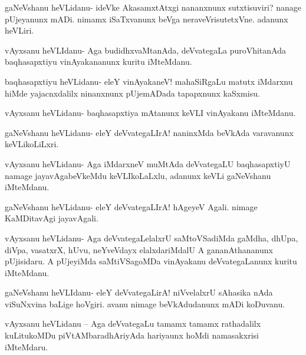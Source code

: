 \documentclass{article}
\begin{document}
\begin{mng}%
gaNeVshanu heVLidanu- ideVke AkasamxtAtxgi nananxnunx sutxtisuviri? nanage pUjeyanunx mADi. nimamx iSaTxvanunx beVga neraveVrisutetxVne. adanunx heVLiri.
\end{mng}

\begin{mng}%
vAyxsanu heVLIdanu- Aga budidhxvaMtanAda, deVvategaLa puroVhitanAda baqhasapxtiyu vinAyakananunx kuritu iMteMdanu.
\end{mng}

\begin{mng}%
baqhasapxtiyu heVLidanu- eleY vinAyakaneV! mahaSiRgaLu matutx iMdarxnu hiMde yajacnxdalilx ninanxnunx pUjemADada tapapxnunx kaSxmisu. 
\end{mng}

\begin{mng}%
vAyxsanu heVLidanu- baqhasapxtiya mAtanunx keVLI vinAyakanu iMteMdanu.
\end{mng}

\begin{mng}%
gaNeVshanu heVLidanu- eleY deVvategaLIrA! naninxMda beVkAda varavanunx keVLikoLiLxri.
\end{mng}

\begin{mng}%
vAyxsanu heVLidanu- Aga iMdarxneV muMtAda deVvategaLU baqhasapxtiyU namage jayavAgabeVkeMdu keVLIkoLaLxlu, adanunx keVLi gaNeVshanu iMteMdanu.
\end{mng}

\begin{mng}%
gaNeVshanu heVLidanu- eleY deVvategaLIrA! hAgeyeV Agali. nimage KaMDitavAgi jayavAgali.
\end{mng}

\begin{mng}%
vAyxsanu heVLidanu- Aga deVvategaLelalxrU saMtoVSadiMda gaMdha, dhUpa, diVpa, vasatxrX, hUvu, neYveVdayx elalxdariMdalU A gananAthananunx pUjisidaru. A pUjeyiMda saMtiVSagoMDa vinAyakanu deVvategaLanunx kuritu iMteMdanu.
\end{mng}

\begin{mng}%
gaNeVshanu heVLIdanu- eleY deVvategaLirA! niVvelalxrU sAhasika nAda viSuNxvina baLige hoVgiri. avanu nimage beVkAdudanunx mADi koDuvanu.
\end{mng}


\begin{mng}%
vAyxsanu heVLidanu -- Aga deVvategaLu tamamx tamamx rathadalilx kuLitukoMDu piVtAMbaradhAriyAda 
hariyaunx hoMdi namasakxrisi iMteMdaru.
\end{mng}
\end{document}

